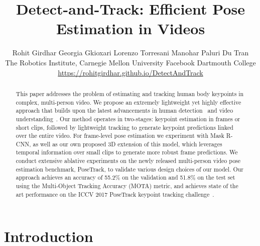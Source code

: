 \documentclass[10pt,twocolumn,letterpaper]{article}
\begin{document}
\title{Detect-and-Track: Efficient Pose Estimation in Videos}

\author{
Rohit Girdhar \quad
Georgia Gkioxari \quad
Lorenzo Torresani \quad
Manohar Paluri \quad
Du Tran
\\
The Robotics Institute, Carnegie Mellon University
\quad
Facebook
\quad
Dartmouth College \\
\small{\url{https://rohitgirdhar.github.io/DetectAndTrack}}
}

\maketitle


\begin{abstract}
This paper addresses the problem of estimating and tracking human body keypoints in complex, multi-person video. 
We propose an extremely lightweight yet highly effective approach that builds upon
the latest advancements in human detection~\cite{he2017mask} and
video understanding~\cite{carreira2017quo}. Our method operates in two-stages: keypoint estimation in frames or short clips, followed by lightweight tracking to generate keypoint predictions linked over the entire video. For frame-level pose estimation we experiment with Mask R-CNN, as well as our own proposed 3D extension of this model, which leverages temporal information over small clips to generate more robust frame predictions.
We conduct extensive ablative experiments on the newly released multi-person video pose estimation benchmark, PoseTrack, to validate various design choices of our model. Our approach achieves an accuracy of 55.2\% on the validation and 51.8\% on the test set using the Multi-Object Tracking Accuracy (MOTA) metric, and 
achieves state of the art performance on the ICCV 2017 PoseTrack keypoint tracking challenge~\cite{posetrack_challenge}. 


\end{abstract}




 

\section{Introduction}
\end{document}
